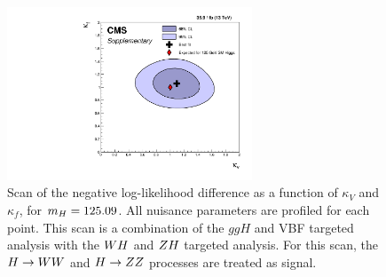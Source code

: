 \begin{figure}[!ht]
 \begin{center}
  \includegraphics[width=0.65\textwidth]{higgs_to_taus_vh/plots/combined/kFkV_HIG-18-007_plus_HIG-16-043.pdf}
 \end{center}
 \caption{Scan of the negative 
 log-likelihood difference as a function of $\kappa_V$ and $\kappa_f$, for 
 $m_{H} = 125.09$\GeV.  All nuisance parameters are profiled for each point. 
 This scan is a combination of the $ggH$ and VBF targeted analysis with the 
 $WH$ and $ZH$ targeted analysis.
 For this scan, the $H\to WW$ and $H\to ZZ$ processes 
 are treated as signal.
 }
 \label{fig:cmb_kFkV}
\end{figure}



\clearpage
